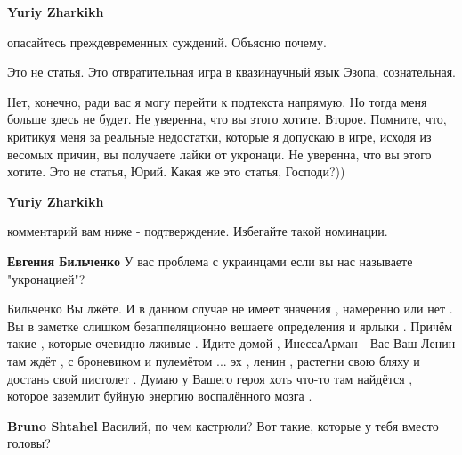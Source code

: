 \begin{itemize}
\begin{itemize}
 
\textbf{Yuriy Zharkikh} 

опасайтесь преждевременных суждений. Объясню почему.

Это не статья. Это отвратительная игра в квазинаучный язык Эзопа, сознательная.

Нет, конечно, ради вас я могу перейти к подтекста напрямую. Но тогда меня
больше здесь не будет. Не уверенна, что вы этого хотите. Второе. Помните, что,
критикуя меня за реальные недостатки, которые я допускаю в игре, исходя из
весомых причин, вы получаете лайки от укронаци. Не уверенна, что вы этого
хотите. Это не статья, Юрий. Какая же это статья, Господи?))


 
\textbf{Yuriy Zharkikh} 

комментарий вам ниже - подтверждение. Избегайте такой номинации.


 
\textbf{Евгения Бильченко}
У вас проблема с украинцами если вы нас называете "укронацией"?
\end{itemize}

 

Бильченко Вы лжёте. И в данном случае не имеет значения , намеренно или нет .
Вы в заметке слишком безаппеляционно вешаете определения и ярлыки . Причём
такие , которые очевидно лживые . Идите домой , ИнессаАрман - Вас Ваш Ленин там
ждёт , с броневиком и пулемётом ... эх , ленин , растегни свою бляху и достань
свой пистолет . Думаю у Вашего героя хоть что-то там найдётся , которое
заземлит буйную энергию воспалённого мозга .

\begin{itemize}
 
\textbf{Bruno Shtahel} Василий, по чем кастрюли? Вот такие, которые у тебя вместо головы?
\end{itemize}

\end{itemize}

